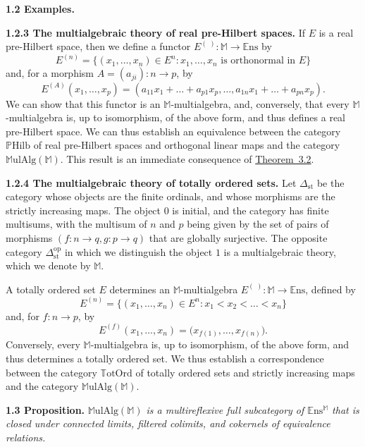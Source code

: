\documentclass{article}
\newenvironment{itenv}[1]
  {\phantomsection\par\medskip\noindent\textbf{#1.}\itshape}
  {\medskip}
\newenvironment{rmenv}[1]
  {\phantomsection\par\medskip\noindent\textbf{#1.}\rmfamily}
  {\medskip}
\newcommand{\bb}[1]{{\mathbb{#1}}}
\newcommand{\op}{{\mathrm{op}}}
\newcommand{\st}{{\mathrm{st}}}
\newcommand{\Set}{\mathbb{E}\mathrm{ns}}
\newcommand{\MulAlg}{\mathbb{M}\mathrm{ulAlg}}
\newcommand{\PHilb}{\mathbb{P}\mathrm{Hilb}}
\newcommand{\TotOrd}{\mathbb{T}\mathrm{otOrd}}
\newcommand{\oldpage}[1]{\marginpar{\footnotesize$\Big\vert$ \textit{p.~#1}}}
\begin{document}
\begin{rmenv}{1.2 Examples}
\begin{rmenv}{1.2.3 The multialgebraic theory of real pre-Hilbert spaces}
    If $E$ is a real pre-Hilbert space, then we define a functor $E^{(\,\,)}\colon\bb{M}\to\Set$ by
    \[
      E^{(n)} =
      \big\{
        (x_1,\ldots,x_n)\in E^n
        :
        \mbox{$x_1,\ldots,x_n$ is orthonormal in $E$}
      \big\}
    \]
    and, for a morphism $A=(a_{ji})\colon n\to p$, by
    \[
      E^{(A)}(x_1,\ldots,x_p) =
      (a_{11}x_1+\ldots+a_{p1}x_p,\ldots,a_{1n}x_1+\ldots+a_{pn}x_p).
    \]
    We can show that this functor is an $\bb{M}$-multialgebra, and, conversely, that every $\bb{M}$-multialgebra is, up to isomorphism, of the above form, and thus defines a real pre-Hilbert space.
    We can thus establish an equivalence between the category $\PHilb$ of real pre-Hilbert spaces and orthogonal linear maps and the category $\MulAlg(\bb{M})$.
    This result is an immediate consequence of \hyperref[3.2]{Theorem~3.2}.
  \end{rmenv}

  \begin{rmenv}{1.2.4 The multialgebraic theory of totally ordered sets}
  \label{1.2.4}
    Let $\Delta_\st$ be the category whose objects are the finite ordinals, and whose morphisms are the
\oldpage{197}
    strictly increasing maps.
    The object $0$ is initial, and the category has finite multisums, with the multisum of $n$ and $p$ being given by the set of pairs of morphisms $(f\colon n\to q,g\colon p\to q)$ that are globally surjective.
    The opposite category $\Delta_\st^\op$ in which we distinguish the object $1$ is a multialgebraic theory, which we denote by $\bb{M}$.

    A totally ordered set $E$ determines an $\bb{M}$-multialgebra $E^{(\,\,)}\colon\bb{M}\to\Set$, defined by
    \[
      E^{(n)} =
      \big\{
        (x_1,\ldots,x_n)\in E^n
        :
        x_1<x_2<\ldots<x_n
      \big\}
    \]
    and, for $f\colon n\to p$, by
    \[
      E^{(f)}(x_1,\ldots,x_n) =
      \big(
        x_{f(1)},\ldots,x_{f(n)}
      \big).
    \]
    Conversely, every $\bb{M}$-multialgebra is, up to isomorphism, of the above form, and thus determines a totally ordered set.
    We thus establish a correspondence between the category $\TotOrd$ of totally ordered sets and strictly increasing maps and the category $\MulAlg(\bb{M})$.
  \end{rmenv}

\end{rmenv}

\begin{itenv}{1.3 Proposition}
\label{1.3}
  $\MulAlg(\bb{M})$ is a multireflexive full subcategory of $\Set^\bb{M}$ that is closed under connected limits, filtered colimits, and cokernels of equivalence relations.
\end{itenv}
\end{document}
